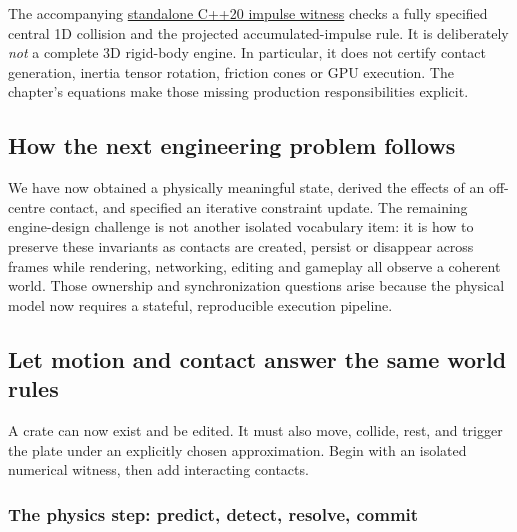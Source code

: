 The accompanying \hyperref[source-file-128143bcbfc7213e97eaefa4]{standalone C++20 impulse witness} checks a fully specified central 1D collision and the projected accumulated-impulse rule. It is deliberately \emph{not} a complete 3D rigid-body engine. In particular, it does not certify contact generation, inertia tensor rotation, friction cones or GPU execution. The chapter's equations make those missing production responsibilities explicit.

\subsection{How the next engineering problem follows}\label{06-engine-ii-ch033-how-the-next-engineering-problem-follows}

\hypertarget{06-engine-ii-ch033-how-the-next-engineering-problem-follows}{}

We have now obtained a physically meaningful state, derived the effects of an off-centre contact, and specified an iterative constraint update. The remaining engine-design challenge is not another isolated vocabulary item: it is how to preserve these invariants as contacts are created, persist or disappear across frames while rendering, networking, editing and gameplay all observe a coherent world. Those ownership and synchronization questions arise because the physical model now requires a stateful, reproducible execution pipeline.

\subsection{Let motion and contact answer the same world rules}\label{06-engine-ii-ch033-let-motion-and-contact-answer-the-same-world-rules}

\hypertarget{06-engine-ii-ch033-let-motion-and-contact-answer-the-same-world-rules}{}

A crate can now exist and be edited. It must also move, collide, rest, and trigger the plate under an explicitly chosen approximation. Begin with an isolated numerical witness, then add interacting contacts.

\subsubsection{The physics step: predict, detect, resolve, commit}\label{06-engine-ii-ch033-the-physics-step-predict-detect-resolve-commit}

\hypertarget{06-engine-ii-ch033-the-physics-step-predict-detect-resolve-commit}{}

